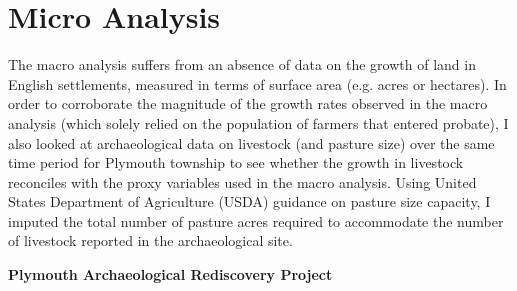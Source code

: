 \documentclass[11pt, oneside]{article}
\begin{document}


\section{Micro Analysis}
The macro analysis suffers from an absence of data on the growth of land in English settlements, measured in terms of surface area (e.g. acres or hectares). In order to corroborate the magnitude of the growth rates observed in the macro analysis (which solely relied on the population of farmers that entered probate), I also looked at archaeological data on livestock (and pasture size) over the same time period for Plymouth township to see whether the growth in livestock reconciles with the proxy variables used in the macro analysis. Using United States Department of Agriculture (USDA) guidance on pasture size capacity, I imputed the total number of pasture acres required to accommodate the number of livestock reported in the archaeological site.

\noindent\textbf{Plymouth Archaeological Rediscovery Project}
\end{document}
